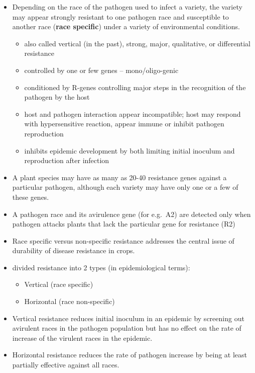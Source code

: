 \documentclass[11pt,dvipsnames,ignorenonframetext,aspectratio=169]{beamer}
\providecommand{\tightlist}{%
  \setlength{\itemsep}{0pt}\setlength{\parskip}{0pt}}
\begin{document}
\begin{frame}{}
\protect\hypertarget{section-17}{}
\begin{itemize}
\tightlist
\item
  Depending on the race of the pathogen used to infect a variety, the
  variety may appear strongly resistant to one pathogen race and
  susceptible to another race (\textbf{race specific}) under a variety
  of environmental conditions.

  \begin{itemize}
  \tightlist
  \item
    also called vertical (in the past), strong, major, qualitative, or
    differential resistance
  \item
    controlled by one or few genes -- mono/oligo-genic
  \item
    conditioned by R-genes controlling major steps in the recognition of
    the pathogen by the host
  \item
    host and pathogen interaction appear incompatible; host may respond
    with hypersensitive reaction, appear immune or inhibit pathogen
    reproduction
  \item
    inhibits epidemic development by both limiting initial inoculum and
    reproduction after infection
  \end{itemize}
\item
  A plant species may have as many as 20-40 resistance genes against a
  particular pathogen, although each variety may have only one or a few
  of these genes.
\item
  A pathogen race and its avirulence gene (for e.g.~A2) are detected
  only when pathogen attacks plants that lack the particular gene for
  resistance (R2)
\end{itemize}
\end{frame}

\begin{frame}{}
\protect\hypertarget{section-18}{}
\begin{itemize}
\tightlist
\item
  Race specific versus non-specific resistance addresses the central
  issue of durability of disease resistance in crops.
\item
  \citet{vanderplank2012disease} divided resistance into 2 types (in
  epidemiological terms):

  \begin{itemize}
  \tightlist
  \item
    Vertical (race specific)
  \item
    Horizontal (race non-specific)
  \end{itemize}
\item
  Vertical resistance reduces initial inoculum in an epidemic by
  screening out avirulent races in the pathogen population but has no
  effect on the rate of increase of the virulent races in the epidemic.
\item
  Horizontal resistance reduces the rate of pathogen increase by being
  at least partially effective against all races.
\end{itemize}
\end{frame}
\end{document}
